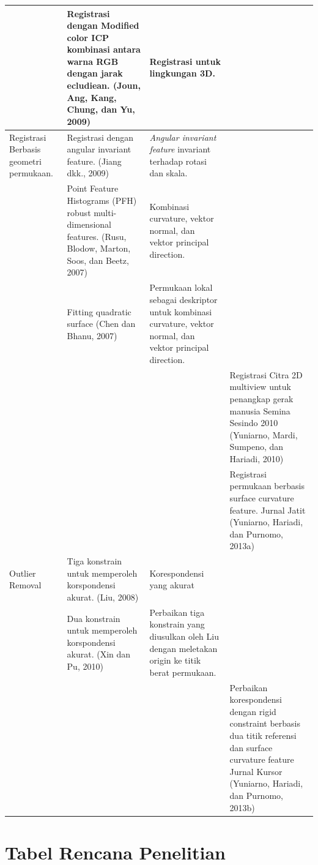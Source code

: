 \begin{landscape}
\begin{spacing}{1}
\begin{longtable}{|p{3cm}| p{7cm} | p{7cm} | p{7cm}|}
				& Registrasi dengan Modified color ICP kombinasi antara warna RGB dengan jarak ecludiean. (Joun, Ang, Kang, Chung, dan Yu, 2009) & Registrasi untuk lingkungan 3D. & \\ \hline 
				Registrasi Berbasis geometri permukaan. & Registrasi dengan angular invariant feature. (Jiang dkk., 2009) & \textit{Angular invariant feature} invariant terhadap rotasi dan skala. & \\ \hline 
				& Point Feature Histograms (PFH) robust multi-dimensional features. (Rusu, Blodow, Marton, Soos, dan Beetz, 2007) & Kombinasi curvature, vektor normal, dan vektor principal direction. & \\ \hline 
				& Fitting quadratic surface (Chen dan Bhanu, 2007) & Permukaan lokal sebagai deskriptor untuk kombinasi curvature, vektor normal, dan vektor principal direction. & \\ \hline 
				& & & Registrasi Citra 2D multiview untuk penangkap gerak manusia Semina Sesindo 2010 (Yuniarno, Mardi, Sumpeno, dan Hariadi, 2010) \\ \hline 
				& & & Registrasi permukaan berbasis surface curvature feature. Jurnal Jatit (Yuniarno, Hariadi, dan Purnomo, 2013a) \\ \hline 
				Outlier Removal & Tiga konstrain untuk memperoleh korspondensi akurat. (Liu, 2008) & Korespondensi yang akurat & \\ \hline 
				& Dua konstrain untuk memperoleh korspondensi akurat. (Xin dan Pu, 2010) & Perbaikan tiga konstrain yang diusulkan oleh Liu dengan meletakan origin ke titik berat permukaan. & \\ \hline 
				& & & Perbaikan korespondensi dengan rigid constraint berbasis dua titik referensi dan surface curvature feature Jurnal Kursor (Yuniarno, Hariadi, dan Purnomo, 2013b) \cite{Brathwaite2009} \\ \hline 
			\end{longtable}
		\end{spacing}
	\end{landscape}


\section{Tabel Rencana Penelitian }


